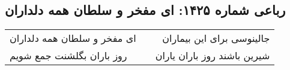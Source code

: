 \begin{center}
\section*{رباعی شماره ۱۴۲۵: ای مفخر و سلطان همه دلداران}
\label{sec:1425}
\begin{longtable}{l p{0.5cm} r}
ای مفخر و سلطان همه دلداران
&&
جالینوسی برای این بیماران
\\
روز باران بگلشنت جمع شویم
&&
شیرین باشند روز باران یاران
\\
\end{longtable}
\end{center}
